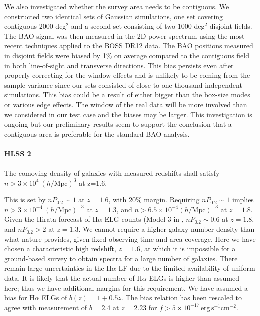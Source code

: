  We also investigated whether the survey area needs to be contiguous. We
 constructed two identical sets of Gaussian simulations, one set covering
 contiguous 2000 deg$^2$ and a second set consisting of two $1000$ deg$^2$
 disjoint fields. The BAO signal was then measured in the 2D power spectrum using the
 most recent techniques applied to the BOSS DR12 data. The BAO positions measured
 in disjoint fields were biased by 1\% on average compared to the contiguous
 field in both line-of-sight and transverse directions. This bias persists even
 after properly correcting for the window effects and is unlikely to be coming
 from the sample variance since our sets consisted of close to one thousand
 independent simulations. This bias could be a result of either bigger than the
 box-size modes or various edge effects. The window of the real data will be more
 involved than we considered in our test case and the biases may be larger. This
 investigation is ongoing but our preliminary results seem to support the
 conclusion that a contiguous area is preferable for the standard BAO analysis.

\paragraph{HLSS 2} The comoving density of galaxies with measured redshifts shall satisfy $n > 3\times10^{4}\ (h/\textrm{Mpc})^3$ at z=1.6.

 This is set by $nP_{0.2} \sim1$ at $z=1.6$, with 20\% margin. Requiring $nP_{0.2}
 \sim1$ implies $n> 3\times10^{-4}\ (h/\mathrm{Mpc})^{-3}$ at $z=1.3$, and $n >
 6.5\times 10^{-4} (h/\mathrm{Mpc})^{-3}$ at $z=1.8$. Given the Hirata
 forecast of H$\alpha$ ELG counts (Model 3 in \citet{Pozzetti:2016}, $nP_{0.2}\sim0.6$ at $z=1.8$,
 and $nP_{0.2}>2$ at $z=1.3$.  We cannot require a higher galaxy number density than
 what nature provides, given fixed observing time and area coverage. Here we have
 chosen a characteristic high redshift, $z=1.6$, at which it is impossible for a
 ground-based survey to obtain spectra for a large number of galaxies. There
 remain large uncertainties in the H$\alpha$ LF due to the limited availability of
 uniform data. It is likely that the actual number of H$\alpha$ ELGs is higher than
 assumed here; thus we have additional margins for this requirement. We have
 assumed a bias for H$\alpha$ ELGs of $b(z) = 1+0.5z$. The bias relation has been rescaled
 to agree with \citet{Geach2012} measurement of $b=2.4$ at $z=2.23$ for $f >
 5\times 10^{-17} \, \mathrm{ erg\,s^{-1}cm^{-2}}$.


